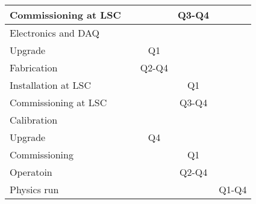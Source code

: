 \begin{center}
\begin{tabular}{| l | c | c | c | c |}
Commissioning at LSC &  & & Q3-Q4& \\
\hline
Electronics and DAQ & & & &   \\
\hline
Upgrade & & Q1 & & \\
Fabrication & & Q2-Q4 & & \\
Installation at LSC & & & Q1& \\
Commissioning at LSC & & & Q3-Q4 & \\
\hline
Calibration & & & &   \\
\hline
Upgrade & & Q4& & \\
Commissioning & & & Q1 & \\
Operatoin & & & Q2-Q4 & \\
\hline
Physics run & & & &  Q1-Q4 \\
\hline
\end{tabular}
\label{tab:schedule_next}
\end{center}

